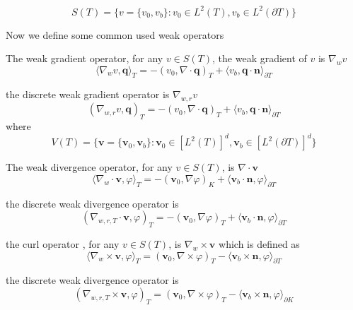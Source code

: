 \begin{equation}
S(T) = \{ v = \{v_{0}, v_{b}\} : v_{0} \in L^{2}(T), v_{b} \in L^{2} (\partial T) \}
\end{equation}

Now we define some common used weak operators

The weak gradient operator, for any $ v \in S(T) $, the weak gradient of $ v $ is $ \nabla_{w} v $
\begin{equation}
\langle \nabla_{w} v, \mathbf{q} \rangle_{T} = -(v_{0}, \nabla \cdot \mathbf{q})_{T} + \langle v_{b}, \mathbf{q} \cdot \mathbf{n} \rangle_{\partial T}
\end{equation}

the discrete weak gradient operator is $ \nabla_{w, r} v $
\begin{equation}
(\nabla_{w,r} v, \mathbf{q})_{T} = -(v_{0}, \nabla \cdot \mathbf{q})_{T} + \langle v_{b}, \mathbf{q} \cdot \mathbf{n} \rangle_{\partial T}
\end{equation}
where
\begin{equation}
V(T) = \{ \mathbf{v} = \{  \mathbf{v}_{0}, \mathbf{v}_{b} \} : \mathbf{v}_{0} \in [L^{2} (T)]^{d}, \mathbf{v}_{b} \in [L^{2} (\partial T)]^{d} \}
\end{equation}

The weak divergence operator, for any $ v \in S(T) $, is $ \nabla \cdot \mathbf{v} $
\begin{equation}
\langle \nabla_{w} \cdot \mathbf{v}, \varphi \rangle_{T} = -(\mathbf{v}_{0}, \nabla \varphi)_{K} + \langle \mathbf{v}_{b} \cdot \mathbf{n}, \varphi \rangle_{\partial T}
\end{equation}

the discrete weak divergence operator is 
\begin{equation}
(\nabla_{w, r, T} \cdot \mathbf{v}, \varphi)_{T} = -(\mathbf{v}_{0}, \nabla \varphi)_{T} + \langle \mathbf{v}_{b} \cdot \mathbf{n}, \varphi \rangle_{\partial T}
\end{equation}

the curl operator , for any $ v \in S(T) $, is $ \nabla_{w} \times \mathbf{v}$ which is defined as 
\begin{equation}
\langle \nabla_{w} \times \mathbf{v}, \varphi \rangle_{T} = (\mathbf{v}_{0}, \nabla \times \varphi)_{T} - \langle \mathbf{v}_{b} \times \mathbf{n}, \varphi \rangle_{\partial T}
\end{equation}

the discrete weak divergence operator is 
\begin{equation}
(\nabla_{w, r, T} \times \mathbf{v}, \varphi)_{T} = (\mathbf{v}_{0}, \nabla \times \varphi)_{T} - \langle \mathbf{v}_{b} \times \mathbf{n}, \varphi \rangle_{\partial K}
\end{equation}

